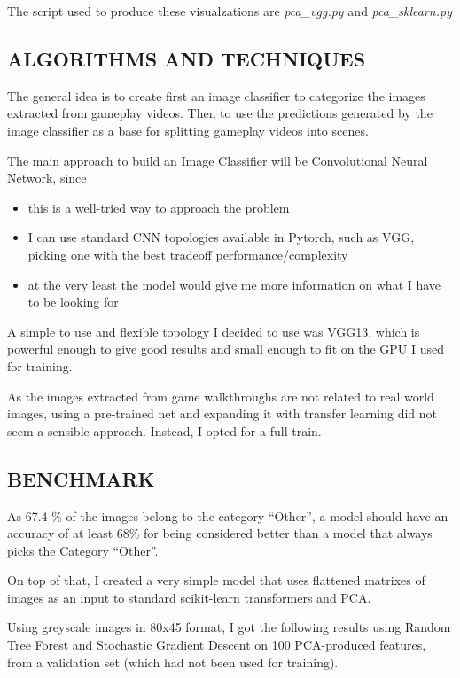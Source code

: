 \documentclass[
]{article}
\providecommand{\tightlist}{%
  \setlength{\itemsep}{0pt}\setlength{\parskip}{0pt}}
\begin{document}
The script used to produce these visualzations are \emph{pca\_vgg.py} and \emph{pca\_sklearn.py}  

\hypertarget{algorithms-and-techniques}{%
\subsection{ALGORITHMS AND
TECHNIQUES}\label{algorithms-and-techniques}}

The general idea is to create first an image classifier to categorize the
images extracted from gameplay videos. Then to use the predictions generated by the image classifier as a base for splitting gameplay videos into scenes.

The main approach to build an Image Classifier will be  Convolutional
Neural Network, since

\begin{itemize}
\tightlist
\item
  this is a well-tried way to approach the problem
\item
  I can use standard CNN topologies available in Pytorch, such as VGG,
  picking one with the best tradeoff performance/complexity
\item
  at the very least the model would give me more information on
  what I have to be looking for
\end{itemize}

A simple to use and flexible topology I decided to use was VGG13, which is
powerful enough to give good results and small enough to fit on the GPU I used for training.

As the images extracted from game walkthroughs are not related to real
world images, using a pre-trained net and expanding it with transfer
learning did not seem a sensible approach. Instead, I opted for a full
train.

\hypertarget{benchmark}{%
\subsection{BENCHMARK}\label{benchmark}}

As 67.4 \% of the images belong to the category ``Other'', a model
should have an accuracy of at least 68\% for being considered better
than a model that always picks the Category ``Other''.

On top of that, I created a very simple model that uses flattened
matrixes of images as an input to standard scikit-learn
transformers and PCA.

Using greyscale images in 80x45 format, I got the following results
using Random Tree Forest and Stochastic Gradient Descent on 100 PCA-produced features, from a
validation set (which had not been used for training).
\end{document}
